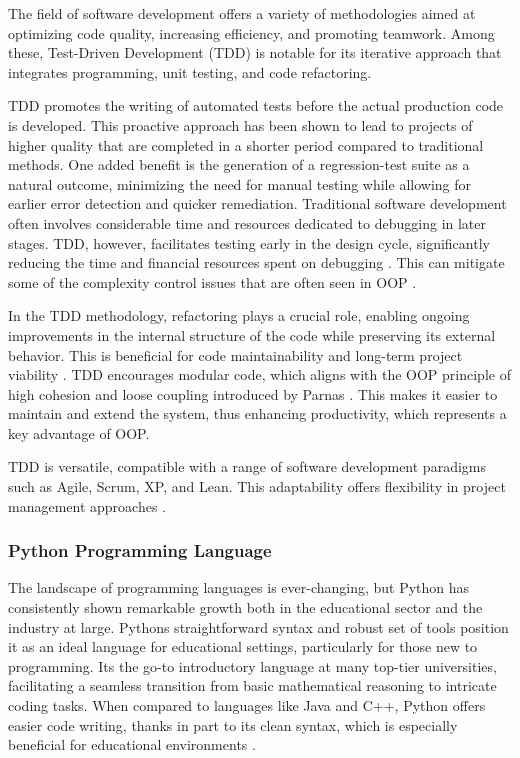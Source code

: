 The field of software development offers a variety of methodologies
aimed at optimizing code quality, increasing efficiency, and promoting
teamwork. Among these, Test-Driven Development (TDD) is notable for its
iterative approach that integrates programming, unit testing, and code
refactoring.

TDD promotes the writing of automated tests before the actual production
code is developed. This proactive approach has been shown to lead to
projects of higher quality that are completed in a shorter period
compared to traditional methods. One added benefit is the generation of
a regression-test suite as a natural outcome, minimizing the need for
manual testing while allowing for earlier error detection and quicker
remediation. Traditional software development often involves
considerable time and resources dedicated to debugging in later stages.
TDD, however, facilitates testing early in the design cycle,
significantly reducing the time and financial resources spent on
debugging \cite{29}. This can
mitigate some of the complexity control issues that are often seen in
OOP \cite{23}\cite{25}.

In the TDD methodology, refactoring plays a crucial role, enabling
ongoing improvements in the internal structure of the code while
preserving its external behavior. This is beneficial for code
maintainability and long-term project viability
\cite{30}. TDD encourages
modular code, which aligns with the OOP principle of high cohesion and
loose coupling introduced by Parnas
\cite{17}\cite{24}. This
makes it easier to maintain and extend the system, thus enhancing
productivity, which represents a key advantage of OOP.

TDD is versatile, compatible with a range of software development
paradigms such as Agile, Scrum, XP, and Lean. This adaptability offers
flexibility in project management approaches
\cite{31}.

\subsubsection{Python Programming
Language}\label{python-programming-language}

The landscape of programming languages is ever-changing, but Python has
consistently shown remarkable growth both in the educational sector and
the industry at large. Python\textquotesingle s straightforward syntax
and robust set of tools position it as an ideal language for educational
settings, particularly for those new to programming.
It\textquotesingle s the go-to introductory language at many top-tier
universities, facilitating a seamless transition from basic mathematical
reasoning to intricate coding tasks. When compared to languages like
Java and C++, Python offers easier code writing, thanks in part to its
clean syntax, which is especially beneficial for educational
environments \cite{32}.

